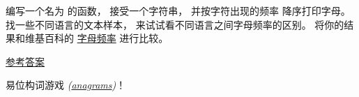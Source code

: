 {\begin{exercise}

编写一个名为 {\em  {}} 的函数，
接受一个字符串， 并按字符出现的频率 降序打印字母。 
找一些不同语言的文本样本， 来试试看不同语言之间字母频率的区别。
将你的结果和维基百科的
\href{http://en.wikipedia.org/wiki/Letter_frequencies}{字母频率} 进行比较。

\href{http://thinkpython2.com/code/most_frequent.py}{参考答案}

 
 

\end{exercise}


\begin{exercise}
\label{anagrams}
  

易位构词游戏 {\em (\href{https://zh.wikipedia.org/wiki/%E6%98%93%E4%BD%8D%E6%9E%84%E8%AF%8D%E6%B8%B8%E6%88%8F}{anagrams})}！

\begin{enumerate}





\end{enumerate}
\end{exercise}}
